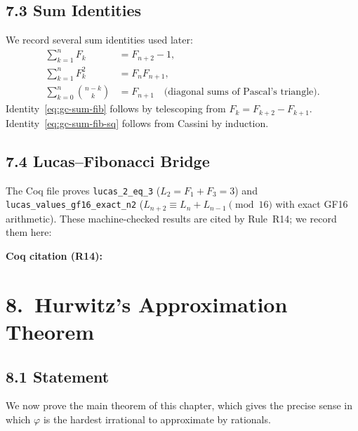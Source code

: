\subsection{7.3 Sum Identities}
\label{subsec:gc-sums}

We record several sum identities used later:
\begin{align}
  \sum_{k=1}^{n} F_k &= F_{n+2} - 1,
  \label{eq:gc-sum-fib}\\
  \sum_{k=1}^{n} F_k^2 &= F_n F_{n+1},
  \label{eq:gc-sum-fib-sq}\\
  \sum_{k=0}^{n} \binom{n-k}{k} &= F_{n+1}
  \quad\text{(diagonal sums of Pascal's triangle)}.
  \label{eq:gc-pascal}
\end{align}
Identity~\eqref{eq:gc-sum-fib} follows by
telescoping from $F_k = F_{k+2} - F_{k+1}$.
Identity~\eqref{eq:gc-sum-fib-sq} follows from
Cassini by induction.

\subsection{7.4 Lucas--Fibonacci Bridge}
\label{subsec:gc-bridge}

The Coq file
proves \texttt{lucas\_2\_eq\_3} ($L_2 = F_1 + F_3 = 3$)
and \texttt{lucas\_values\_gf16\_exact\_n2}
($L_{n+2} \equiv L_n + L_{n-1} \pmod{16}$ with exact
GF16 arithmetic).
These machine-checked results are cited by Rule~R14;
we record them here:

\medskip
\noindent
\textbf{Coq citation (R14):}

\section{8.\ Hurwitz's Approximation Theorem}
\label{sec:gc-hurwitz}

\subsection{8.1 Statement}
\label{subsec:gc-hurwitz-stmt}

We now prove the main theorem of this chapter, which
gives the precise sense in which $\varphi$ is the
hardest irrational to approximate by rationals.

